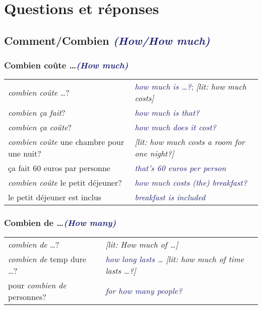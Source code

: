 \documentclass{microdoc} %
\newcommand\lEmph[1]{\textcolor{OliveGreen}{\emph{#1}}}
\newcommand\lEng[1]{\textcolor{MidnightBlue}{{\it #1}}}
\newcommand\lEngLit[1]{{\it[lit: \textcolor{NavyBlue}{#1}]}}
\begin{document}
\section{Questions et réponses} %
\subsection{Comment/Combien \lEng{(How/How much)}} %
\subsubsection{Combien coûte \ldots \lEng{(How much)}}
\begin{table}[H]
    \begin{tabular}{l l}
        \lEmph{combien coûte} \ldots?                    & \lEng{how much is \ldots?}; \lEngLit{how much costs}\\
        \lEmph{combien ça fait}?                         & \lEng{how much is that?}\\
        \lEmph{combien ça coûte}?                        & \lEng{how much does it cost?}\\
        \lEmph{combien coûte} une chambre pour une nuit? & \lEngLit{how much costs a room for one night?}\\
        ça fait 60 euros par personne                    & \lEng{that's 60 euros per person}\\
        \lEmph{combien coûte} le petit déjeuner?         & \lEng{how much costs (the) breakfast?}\\
        le petit déjeuner est inclus                     & \lEng{breakfast is included}\\
    \end{tabular}
\end{table}

\subsubsection{Combien de \ldots \lEng{(How many)}}
\begin{table}[H]
    \begin{tabular}{l l}
        \emph{combien de} \ldots?                       & \lEngLit{How much of \ldots}\\
        \emph{combien de} temp dure \ldots?             & \lEng{how long lasts \ldots} \lEngLit{how much of time lasts \ldots?}\\
        pour \emph{combien de} personnes?               & \lEng{for how many people?}\\
    \end{tabular}
\end{table}
\end{document}
